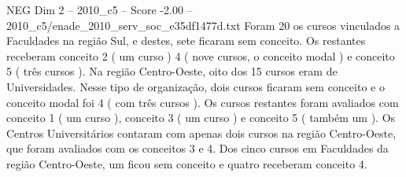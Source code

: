 \begin{textsample}{NEG Dim 2 – 2010\_c5 – Score -2.00 – 2010\_c5/enade\_2010\_serv\_soc\_e35df1477d.txt}
Foram 20 os cursos vinculados a Faculdades na região Sul, e destes, sete ficaram sem conceito.
Os restantes receberam conceito 2 ( um curso ) 4 ( nove cursos, o conceito modal ) e conceito 5 ( três cursos ).
Na região Centro-Oeste, oito dos 15 cursos eram de Universidades.
Nesse tipo de organização, dois cursos ficaram sem conceito e o conceito modal foi 4 ( com três cursos ).
Os cursos restantes foram avaliados com conceito 1 ( um curso ), conceito 3 ( um curso ) e conceito 5 ( também um ).
Os Centros Universitários contaram com apenas dois cursos na região Centro-Oeste, que foram avaliados com os conceitos 3 e 4.
Dos cinco cursos em Faculdades da região Centro-Oeste, um ficou sem conceito e quatro receberam conceito 4.

\end{textsample}
